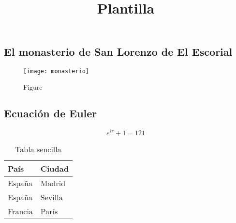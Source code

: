 \documentclass{report}
\begin{document}
	
	
	\title{Plantilla}
	
	\tableofcontents
	
	\thispagestyle{empty}
	
	
	\listoffigures
	
	\listoftables
	
	
	\chapter{}
	
	\section{El monasterio de San Lorenzo de El Escorial}
	
	\begin{figure}[h]
		\texttt{[image: monasterio]}
		\caption{Figure}
	\end{figure}
		
	\lipsum[12]\cite{Feireisl2016}
	
	\section{Ecuación de Euler}
	
	\lipsum[4]
	
	\begingroup
	\Large 
	\begin{equation}
		  e^{i\pi}+1 = 121
	\end{equation}	
	\endgroup
	
	\vspace{1cm}
	\lipsum[1]
	
	\begin{table}[htb]
		\begin{center}
			\begin{tabular}{|l|l|}
				\hline
				País & Ciudad \\
				\hline \hline
				España & Madrid \\ \hline
				España & Sevilla \\ \hline
				Francia & París \\ \hline
			\end{tabular}
			\caption{Tabla sencilla}
			\label{tabla:sencilla}
		\end{center}
	\end{table}
\end{document}
